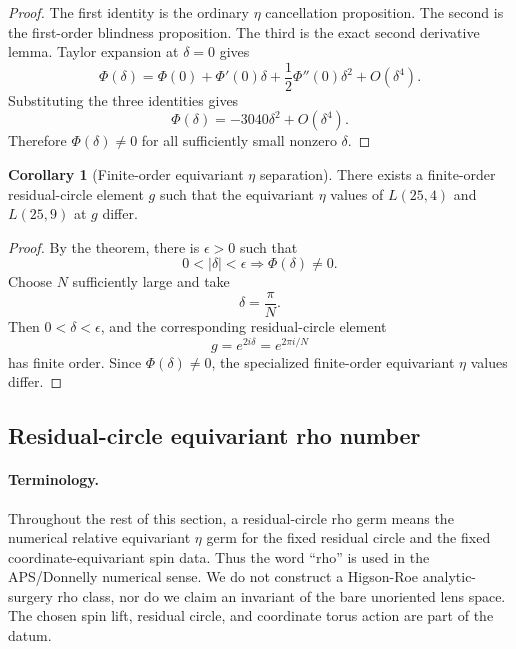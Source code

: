 \documentclass{article}
\theoremstyle{definition}
\newtheorem{corollary}[theorem]{Corollary}
\numberwithin{equation}{section}
\begin{document}
\begin{proof}
The first identity is the ordinary $\eta$ cancellation proposition.  The second is the first-order blindness proposition.  The third is the exact second derivative lemma.  Taylor expansion at $\delta=0$ gives
\begin{equation}
\Phi(\delta)
=
\Phi(0)+\Phi'(0)\delta+\frac12\Phi''(0)\delta^2+O(\delta^4).
\end{equation}
Substituting the three identities gives
\begin{equation}
\Phi(\delta)
=
-3040\delta^2+O(\delta^4).
\end{equation}
Therefore $\Phi(\delta)\neq 0$ for all sufficiently small nonzero $\delta$.
\end{proof}

\begin{corollary}[Finite-order equivariant $\eta$ separation]
There exists a finite-order residual-circle element $g$ such that the equivariant $\eta$ values of $L(25,4)$ and $L(25,9)$ at $g$ differ.

\end{corollary}

\begin{proof}
By the theorem, there is $\epsilon>0$ such that
\begin{equation}
0<|\delta|<\epsilon
\Longrightarrow
\Phi(\delta)\neq 0.
\end{equation}
Choose $N$ sufficiently large and take
\begin{equation}
\delta=\frac{\pi}{N}.
\end{equation}
Then $0<\delta<\epsilon$, and the corresponding residual-circle element
\begin{equation}
g=e^{2i\delta}=e^{2\pi i/N}
\end{equation}
has finite order.  Since $\Phi(\delta)\neq 0$, the specialized finite-order equivariant $\eta$ values differ.
\end{proof}

\subsection{Residual-circle equivariant rho number}
\label{subsec:stage5B1-residual-circle-rho}

\paragraph{Terminology.}
Throughout the rest of this section, a residual-circle rho germ means the numerical relative equivariant $\eta$ germ for the fixed residual circle and the fixed coordinate-equivariant spin data.  Thus the word ``rho'' is used in the APS/Donnelly numerical sense.  We do not construct a Higson-Roe analytic-surgery rho class, nor do we claim an invariant of the bare unoriented lens space.  The chosen spin lift, residual circle, and coordinate torus action are part of the datum.
\end{document}
